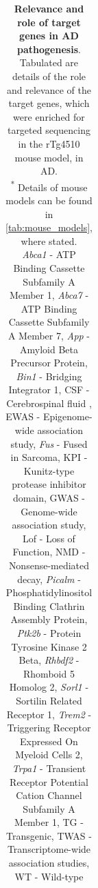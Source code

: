 	\begin{landscape}
		\small %
		\setlength\tabcolsep{2pt} %
		\begin{longtable}[c]{p{1cm}p{2cm}p{4cm}p{19cm}}
			\caption[Relevance and role of target genes in AD pathogenesis]%
			{\textbf{Relevance and role of target genes in AD pathogenesis}. Tabulated are details of the role and relevance of the target genes, which were enriched for targeted sequencing in the rTg4510 mouse model, in AD. \\
			\textsuperscript{*} Details of mouse models can be found in \cref{tab:mouse_models}, where stated. \\ 
			\textit{Abca1} - ATP Binding Cassette Subfamily A Member 1, \textit{Abca7} - ATP Binding Cassette Subfamily A Member 7, \textit{App} - Amyloid Beta Precursor Protein, \textit{Bin1} - Bridging Integrator 1, CSF - Cerebrospinal fluid , EWAS - Epigenome-wide association study, \textit{Fus} - Fused in Sarcoma, KPI - Kunitz-type protease inhibitor domain, GWAS - Genome-wide association study, Lof - Loss of Function, NMD - Nonsense-mediated decay, \textit{Picalm} - Phosphatidylinositol Binding Clathrin Assembly Protein, \textit{Ptk2b} - Protein Tyrosine Kinase 2 Beta,  \textit{Rhbdf2} - Rhomboid 5 Homolog 2, \textit{Sorl1} - Sortilin Related Receptor 1, \textit{Trem2} - Triggering Receptor Expressed On Myeloid Cells 2, \textit{Trpa1} - Transient Receptor Potential Cation Channel Subfamily A Member 1, TG - Transgenic, TWAS - Transcriptome-wide association studies, WT - Wild-type}
			\label{tab: TargetGenes_LitReview}\\
			

\end{longtable}
\end{landscape}
